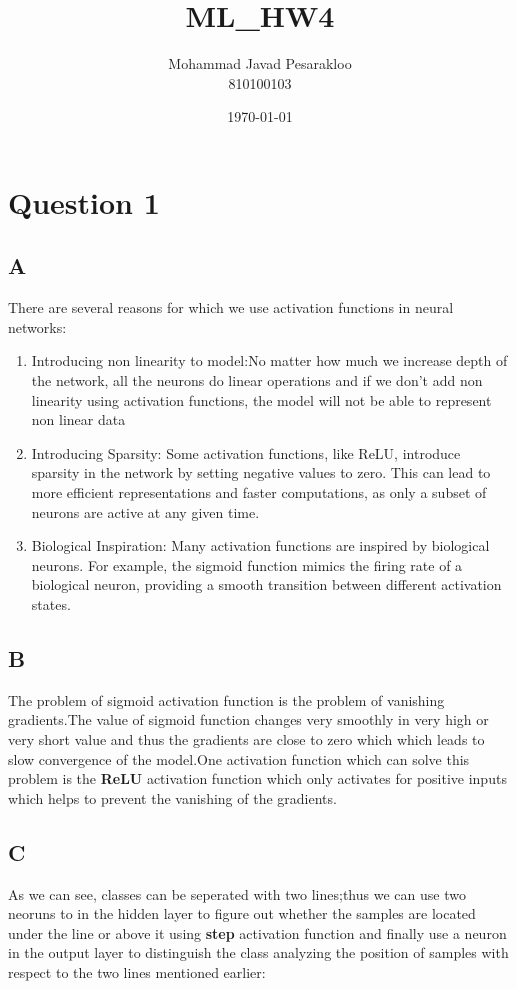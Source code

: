 \documentclass{article}
\title{ML\_HW4}
\author{Mohammad Javad Pesarakloo\\810100103}
\date{\today}
\begin{document}
\maketitle

\section*{Question 1}

\subsection*{A}
There are several reasons for which we use activation functions in neural networks:
\begin{enumerate}
\item Introducing non linearity to model:No matter how much we increase depth of the network, all the neurons do linear operations and if we don't add non linearity using activation functions, the model will not be able to represent non linear data

\item Introducing Sparsity: Some activation functions, like ReLU, introduce sparsity in the network by setting negative values to zero. This can lead to more efficient representations and faster computations, as only a subset of neurons are active at any given time.

\item Biological Inspiration: Many activation functions are inspired by biological neurons. For example, the sigmoid function mimics the firing rate of a biological neuron, providing a smooth transition between different activation states.
\end{enumerate}


\subsection*{B}
The problem of sigmoid activation function is the problem of vanishing gradients.The value of sigmoid function changes very smoothly in very high or very short value and thus the gradients are close to zero which which leads to slow convergence of the model.One activation function which can solve this problem is the \textbf{ReLU} activation function which only activates for positive inputs which helps to prevent the vanishing of the gradients.

\subsection*{C}
As we can see, classes can be seperated with two lines;thus we can use two neoruns to in the hidden layer to figure out whether the samples are located under the line or above it using \textbf{step} activation function and finally use a neuron in the output layer to distinguish the class analyzing the position of samples with respect to the two lines mentioned earlier:
\end{document}
